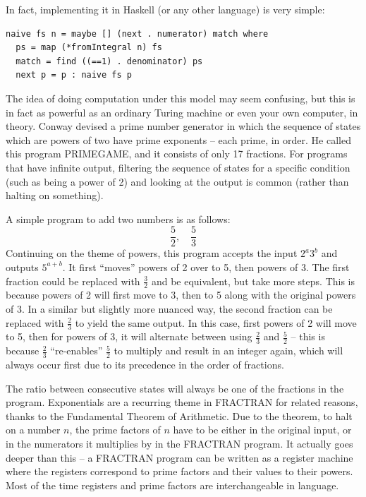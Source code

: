 \documentclass[12pt]{article}
\begin{document}
In fact, implementing it in Haskell (or any other language) is very simple:
\begin{verbatim}
naive fs n = maybe [] (next . numerator) match where
  ps = map (*fromIntegral n) fs
  match = find ((==1) . denominator) ps
  next p = p : naive fs p
\end{verbatim}

The idea of doing computation under this model may seem confusing, but this is in fact as powerful as an ordinary Turing machine or even your own computer, in theory. Conway devised a prime number generator in which the sequence of states which are powers of two have prime exponents -- each prime, in order. He called this program PRIMEGAME, and it consists of only 17 fractions. For programs that have infinite output, filtering the sequence of states for a specific condition (such as being a power of 2) and looking at the output is common (rather than halting on something).

A simple program to add two numbers is as follows:
\[
\frac{5}{2},\quad \frac{5}{3}
\]
Continuing on the theme of powers, this program accepts the input $2^a 3^b$ and outputs $5^{a+b}$. It first ``moves'' powers of 2 over to 5, then powers of 3. The first fraction could be replaced with $\frac{3}{2}$ and be equivalent, but take more steps. This is because powers of 2 will first move to 3, then to 5 along with the original powers of 3. In a similar but slightly more nuanced way, the second fraction can be replaced with $\frac{2}{3}$ to yield the same output. In this case, first powers of 2 will move to 5, then for powers of 3, it will alternate between using $\frac{2}{3}$ and $\frac{5}{2}$ -- this is because $\frac{2}{3}$ ``re-enables'' $\frac{5}{2}$ to multiply and result in an integer again, which will always occur first due to its precedence in the order of fractions.

The ratio between consecutive states will always be one of the fractions in the program. Exponentials are a recurring theme in FRACTRAN for related reasons, thanks to the Fundamental Theorem of Arithmetic. Due to the theorem, to halt on a number $n$, the prime factors of $n$ have to be either in the original input, or in the numerators it multiplies by in the FRACTRAN program. It actually goes deeper than this -- a FRACTRAN program can be written as a register machine where the registers correspond to prime factors and their values to their powers. Most of the time registers and prime factors are interchangeable in language.
\end{document}
